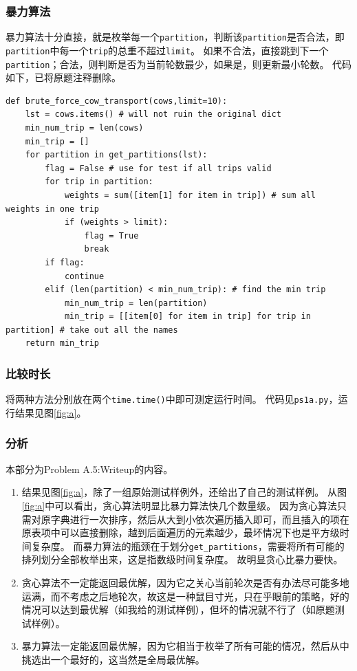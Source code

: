 \documentclass[logo,reportComp]{thesis}
\begin{document}
\subsubsection{暴力算法}
暴力算法十分直接，就是枚举每一个\verb'partition'，判断该\verb'partition'是否合法，即\verb'partition'中每一个\verb'trip'的总重不超过\verb'limit'。
如果不合法，直接跳到下一个\verb'partition'；合法，则判断是否为当前轮数最少，如果是，则更新最小轮数。
代码如下，已将原题注释删除。
\begin{lstlisting}
def brute_force_cow_transport(cows,limit=10):
    lst = cows.items() # will not ruin the original dict
    min_num_trip = len(cows)
    min_trip = []
    for partition in get_partitions(lst):
        flag = False # use for test if all trips valid
        for trip in partition:
            weights = sum([item[1] for item in trip]) # sum all weights in one trip
            if (weights > limit):
                flag = True
                break
        if flag:
            continue
        elif (len(partition) < min_num_trip): # find the min trip
            min_num_trip = len(partition)
            min_trip = [[item[0] for item in trip] for trip in partition] # take out all the names
    return min_trip
\end{lstlisting}

\subsubsection{比较时长}
将两种方法分别放在两个\verb'time.time()'中即可测定运行时间。
代码见\verb'ps1a.py'，运行结果见图\ref{fig:a}。

\subsubsection{分析}
本部分为Problem A.5:Writeup的内容。
\begin{enumerate}
	\item 结果见图\ref{fig:a}，除了一组原始测试样例外，还给出了自己的测试样例。
	从图\ref{fig:a}中可以看出，贪心算法明显比暴力算法快几个数量级。
	因为贪心算法只需对原字典进行一次排序，然后从大到小依次遍历插入即可，而且插入的项在原表项中可以直接删除，越到后面遍历的元素越少，最坏情况下也是平方级时间复杂度。
	而暴力算法的瓶颈在于划分\verb'get_partitions'，需要将所有可能的排列划分全部枚举出来，这是指数级时间复杂度。
	故明显贪心比暴力要快。
	\item 贪心算法不一定能返回最优解，因为它之关心当前轮次是否有办法尽可能多地运满，而不考虑之后地轮次，故这是一种鼠目寸光，只在乎眼前的策略，好的情况可以达到最优解（如我给的测试样例），但坏的情况就不行了（如原题测试样例）。
	\item 暴力算法一定能返回最优解，因为它相当于枚举了所有可能的情况，然后从中挑选出一个最好的，这当然是全局最优解。
\end{enumerate}
\end{document}
